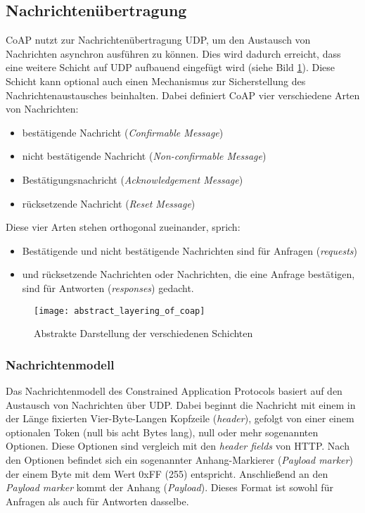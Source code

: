 \subsection{Nachrichtenübertragung}
\label{subsec:nachrichtenuebertragung}

CoAP nutzt zur Nachrichtenübertragung UDP, um den Austausch von Nachrichten asynchron ausführen zu können. Dies wird dadurch erreicht, dass eine weitere Schicht auf UDP aufbauend eingefügt wird (siehe Bild \ref{fig:abstrakte-darstellung-der-verschiedenen-schichten}). Diese Schicht kann optional auch einen Mechanismus zur Sicherstellung des Nachrichtenaustausches beinhalten. Dabei definiert CoAP vier verschiedene Arten von Nachrichten:
\begin{itemize}
    \item bestätigende Nachricht (\textit{Confirmable Message})
    \item nicht bestätigende Nachricht (\textit{Non-confirmable Message})
    \item Bestätigungsnachricht (\textit{Acknowledgement Message})
    \item rücksetzende Nachricht (\textit{Reset Message})
\end{itemize}

Diese vier Arten stehen orthogonal zueinander, sprich:
\begin{itemize}
    \item Bestätigende und nicht bestätigende Nachrichten sind für Anfragen (\textit{requests})
    \item und rücksetzende Nachrichten oder Nachrichten, die eine Anfrage bestätigen, sind für Antworten (\textit{responses}) gedacht.
\end{itemize}

\begin{figure}[h]
    \centering
    \texttt{[image: abstract\_layering\_of\_coap]}
    \caption{Abstrakte Darstellung der verschiedenen Schichten}
    \label{fig:abstrakte-darstellung-der-verschiedenen-schichten}
\end{figure}

\subsubsection{Nachrichtenmodell}
\label{subsubsec:nachrichtenmodell}

Das Nachrichtenmodell des Constrained Application Protocols basiert auf den Austausch von Nachrichten über UDP. Dabei beginnt die Nachricht mit einem in der Länge fixierten Vier-Byte-Langen Kopfzeile (\textit{header}), gefolgt von einer einem optionalen Token (null bis acht Bytes lang), null oder mehr sogenannten Optionen. Diese Optionen sind vergleich mit den \textit{header fields} von HTTP. Nach den Optionen befindet sich ein sogenannter Anhang-Markierer (\textit{Payload marker}) der einem Byte mit dem Wert 0xFF (255) entspricht. Anschließend an den \textit{Payload marker} kommt der Anhang (\textit{Payload}). Dieses Format ist sowohl für Anfragen als auch für Antworten dasselbe.

